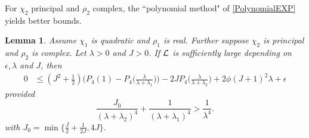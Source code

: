 \documentclass[12pt,psamsfonts]{amsart}
\newtheorem{lem}[thm]{Lemma}
\theoremstyle{definition}
\theoremstyle{remark}
\numberwithin{equation}{section}
\begin{document}
For $\chi_2$ principal and $\rho_2$ complex, the ``polynomial method" of \cref{PolynomialEXP} yields better bounds. 
\begin{lem} \label{SZ-L1L2medium} Assume $\chi_1$ is quadratic and $\rho_1$ is real. Further suppose $\chi_2$ is principal and $\rho_2$ is complex.  Let  $\lambda > 0$ and $J > 0$. If $\mathcal{L}$ is sufficiently large depending on $\epsilon, \lambda$ and $J$, then
\begin{align*}
0 & \leq (J^2 + \tfrac{1}{2}) \big( P_4(1) - P_4\big( \frac{\lambda}{\lambda+\lambda_1} \big) \big) - 2J P_4\big( \frac{\lambda}{\lambda+\lambda_2} \big)   +  2 \phi (J+1)^2 \lambda  + \epsilon 
\end{align*}
provided
\begin{equation}
\frac{J_0}{(\lambda+\lambda_2)^4} + \frac{1}{(\lambda+\lambda_1)^4} > \frac{1}{\lambda^4}. 
\label{SZ-L1L2medium-Condition}
\end{equation}
with $J_0 = \min\{ \tfrac{J}{2} + \tfrac{1}{2J}, 4J \}$. 
\end{lem}
\end{document}
